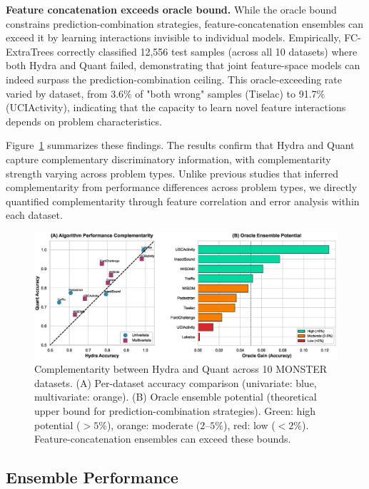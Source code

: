\documentclass[pdflatex,sn-basic]{sn-jnl}           %
\theoremstyle{thmstyleone}%
\theoremstyle{thmstyletwo}%
\theoremstyle{thmstylethree}%
\begin{document}
\textbf{Feature concatenation exceeds oracle bound.} While the oracle bound constrains prediction-combination strategies, feature-concatenation ensembles can exceed it by learning interactions invisible to individual models. Empirically, FC-ExtraTrees correctly classified 12,556 test samples (across all 10 datasets) where both Hydra and Quant failed, demonstrating that joint feature-space models can indeed surpass the prediction-combination ceiling. This oracle-exceeding rate varied by dataset, from 3.6\% of "both wrong" samples (Tiselac) to 91.7\% (UCIActivity), indicating that the capacity to learn novel feature interactions depends on problem characteristics.

Figure~\ref{fig:complementarity} summarizes these findings. The results confirm that Hydra and Quant capture complementary discriminatory information, with complementarity strength varying across problem types. Unlike previous studies that inferred complementarity from performance differences across problem types, we directly quantified complementarity through feature correlation and error analysis within each dataset.

\begin{figure}[t]
\centering
\includegraphics[width=\textwidth]{figure1_complementarity}
\caption{Complementarity between Hydra and Quant across 10 MONSTER datasets. (A) Per-dataset accuracy comparison (univariate: blue, multivariate: orange). (B) Oracle ensemble potential (theoretical upper bound for prediction-combination strategies). Green: high potential ($>5\%$), orange: moderate ($2$--$5\%$), red: low ($<2\%$). Feature-concatenation ensembles can exceed these bounds.}\label{fig:complementarity}
\end{figure}

\subsection{Ensemble Performance}
\end{document}
